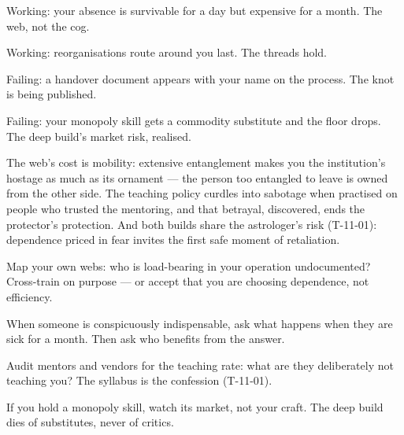 \begin{feedback}
  \item Working: your absence is survivable for a day but expensive for a month. The web, not the cog.
  \item Working: reorganisations route around you last. The threads hold.
  \item Failing: a handover document appears with your name on the process. The knot is being published.
  \item Failing: your monopoly skill gets a commodity substitute and the floor drops. The deep build's market risk, realised.
\end{feedback}
\begin{failure}
The web's cost is mobility: extensive entanglement makes you the institution's hostage as much as its ornament --- the person too entangled to leave is owned from the other side. The teaching policy curdles into sabotage when practised on people who trusted the mentoring, and that betrayal, discovered, ends the protector's protection. And both builds share the astrologer's risk (T-11-01): dependence priced in fear invites the first safe moment of retaliation.
\end{failure}
\begin{countermeasures}
  \item Map your own webs: who is load-bearing in your operation undocumented? Cross-train on purpose --- or accept that you are choosing dependence, not efficiency.
  \item When someone is conspicuously indispensable, ask what happens when they are sick for a month. Then ask who benefits from the answer.
  \item Audit mentors and vendors for the teaching rate: what are they deliberately not teaching you? The syllabus is the confession (T-11-01).
  \item If you hold a monopoly skill, watch its market, not your craft. The deep build dies of substitutes, never of critics.
\end{countermeasures}

\seesources
{}
